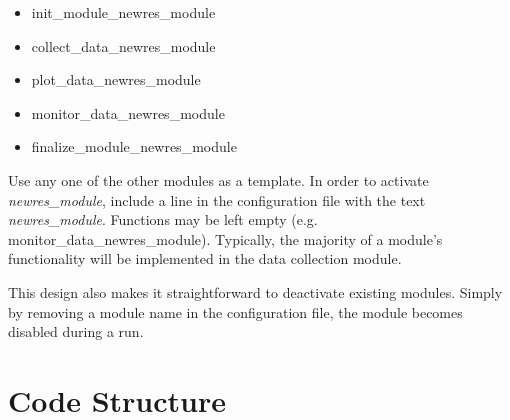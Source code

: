 \documentclass[10pt,a4paper]{report}
\begin{document}
\begin{itemize}
	\item     init\_module\_newres\_module
	\item    collect\_data\_newres\_module
	\item       plot\_data\_newres\_module
	\item    monitor\_data\_newres\_module
	\item finalize\_module\_newres\_module
\end{itemize}

Use any one of the other modules as a template.
In order to activate \emph{newres\_module}, include a line in the configuration file
with the text \textit{newres\_module}. Functions may be left empty (e.g. monitor\_data\_newres\_module). 
Typically, the majority of a module's functionality will be implemented in the data collection module.

This design also makes it straightforward to deactivate existing modules.
Simply by removing a module name in the configuration file, the module becomes disabled during a run.

\FloatBarrier
\section{Code Structure}
\end{document}

